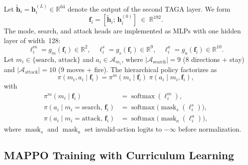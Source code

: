 Let $\tilde{\mathbf{h}}_i = \mathbf{h}_i^{(L)} \!\in\! \mathbb{R}^{64}$
denote the output of the second TAGA layer.  We form
\begin{equation}
  \mathbf{f}_i = [\tilde{\mathbf{h}}_i;\, \mathbf{h}_i^{(0)}]
  \;\in\; \mathbb{R}^{192}.
  \label{eq:feat_concat}
\end{equation}
The mode, search, and attack heads are implemented as MLPs with one hidden
layer of width~128:
\begin{equation}
  \boldsymbol{\ell}_i^{m} = g_m(\mathbf{f}_i) \in \mathbb{R}^{2},\quad
  \boldsymbol{\ell}_i^{s} = g_s(\mathbf{f}_i) \in \mathbb{R}^{9},\quad
  \boldsymbol{\ell}_i^{a} = g_a(\mathbf{f}_i) \in \mathbb{R}^{10}.
  \label{eq:logits}
\end{equation}
Let $m_i \!\in\! \{\text{search},\, \text{attack}\}$ and
$a_i \!\in\! \mathcal{A}_{m_i}$, where
$|\mathcal{A}_{\text{search}}| \!=\! 9$ (8 directions + stay) and
$|\mathcal{A}_{\text{attack}}| \!=\! 10$ (9 moves + fire).
The hierarchical policy factorizes as
\begin{equation}
  \pi(m_i, a_i \mid \mathbf{f}_i)
  = \pi^{m}(m_i \mid \mathbf{f}_i)\;
    \pi(a_i \mid m_i, \mathbf{f}_i),
  \label{eq:policy}
\end{equation}
with
\begin{align}
  \pi^{m}(m_i \mid \mathbf{f}_i)
    &= \operatorname{softmax}(\boldsymbol{\ell}_i^{m}), \label{eq:pi_mode}\\
  \pi(a_i \mid m_i\!=\!\text{search},\, \mathbf{f}_i)
    &= \operatorname{softmax}\!\big(\operatorname{mask}_s(\boldsymbol{\ell}_i^{s})\big),
    \label{eq:pi_search}\\
  \pi(a_i \mid m_i\!=\!\text{attack},\, \mathbf{f}_i)
    &= \operatorname{softmax}\!\big(\operatorname{mask}_a(\boldsymbol{\ell}_i^{a})\big),
    \label{eq:pi_attack}
\end{align}
where $\operatorname{mask}_s$ and $\operatorname{mask}_a$ set invalid-action
logits to $-\infty$ before normalization.

\subsection{MAPPO Training with Curriculum Learning}
\label{sec:mappo}

